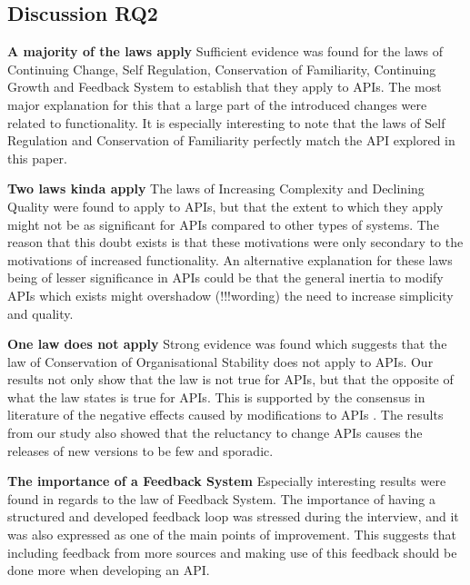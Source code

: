 \documentclass{sig-alternate}
\begin{document}
\subsection{Discussion RQ2}

\noindent
\textbf{A majority of the laws apply  }
Sufficient evidence was found for the laws of Continuing Change, Self Regulation, Conservation of Familiarity, Continuing Growth and Feedback System to establish that they apply to APIs. The most major explanation for this that a large part of the introduced changes were related to functionality. It is especially interesting to note that the laws of Self Regulation and Conservation of Familiarity perfectly match the API explored in this paper. 

\smallskip \noindent
\textbf{Two laws kinda apply  }
The laws of Increasing Complexity and Declining Quality were found to apply to APIs, but that the extent to which they apply might not be as significant for APIs compared to other types of systems. The reason that this doubt exists is that these motivations were only secondary to the motivations of increased functionality. An alternative explanation for these laws being of lesser significance in APIs could be that the general inertia to modify APIs which exists \cite{google_talk} \cite{mcdonnell2013empirical} \cite{robbes2012developers} \cite{henning2007api} might overshadow (!!!wording) the need to increase simplicity and quality. 


\smallskip \noindent
\textbf{One law does not apply  }
Strong evidence was found which suggests that the law of Conservation of Organisational Stability does not apply to APIs. Our results not only show that the law is not true for APIs, but that the opposite of what the law states is true for APIs. This is supported by the consensus in literature of the negative effects caused by modifications to APIs \cite{google_talk} \cite{mcdonnell2013empirical} \cite{robbes2012developers} \cite{henning2007api}. The results from our study also showed that the reluctancy to change APIs causes the releases of new versions to be few and sporadic. 


\smallskip \noindent
\textbf{The importance of a Feedback System  }
Especially interesting results were found in regards to the law of Feedback System. The importance of having a structured and developed feedback loop was stressed during the interview, and it was also expressed as one of the main points of improvement. This suggests that including feedback from more sources and making use of this feedback should be done more when developing an API. 
\end{document}
